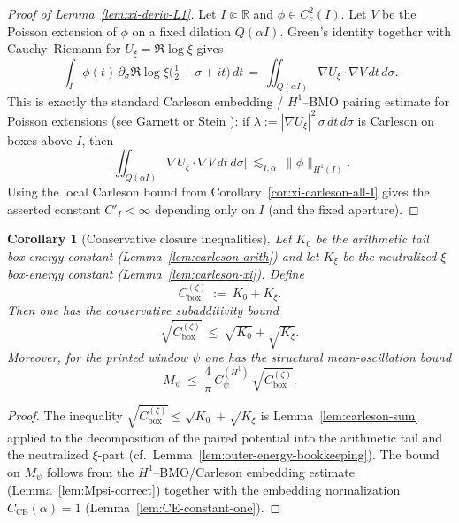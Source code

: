 \documentclass[11pt]{article}
\newif\ifshownumerics
\newtheorem{corollary}[theorem]{Corollary}
\theoremstyle{definition}
\theoremstyle{remark}
\theoremstyle{definition}
\newcommand{\R}{\mathbb{R}}
\begin{document}
\begin{proof}[Proof of Lemma~\ref{lem:xi-deriv-L1}]
Let $I\Subset\R$ and $\phi\in C_c^2(I)$. Let $V$ be the Poisson extension of $\phi$ on a fixed dilation $Q(\alpha I)$. Green's identity together with Cauchy–Riemann for $U_\xi=\Re\log\xi$ gives
\[
  \int_I \phi(t)\,\partial_\sigma\Re\log\xi\!\big(\tfrac12+\sigma+it\big)\,dt
  \,=\, \iint_{Q(\alpha I)} \nabla U_\xi\cdot\nabla V\,dt\,d\sigma.
\]
This is exactly the standard Carleson embedding / $H^1$–BMO pairing estimate for Poisson extensions (see Garnett \cite[Thm.~VI.1.1]{Garnett} or Stein \cite[Ch.~IV]{SteinSingInt}): if $\lambda:=|\nabla U_\xi|^2\,\sigma\,dt\,d\sigma$ is Carleson on boxes above $I$, then
\[
  \Big|\iint_{Q(\alpha I)} \nabla U_\xi\cdot\nabla V\,dt\,d\sigma\Big|
  \ \lesssim_{I,\alpha}\ \|\phi\|_{H^1(I)}.
\]
Using the local Carleson bound from Corollary~\ref{cor:xi-carleson-all-I} gives the asserted constant $C'_I<\infty$ depending only on $I$ (and the fixed aperture).
\end{proof}
\begin{corollary}[Conservative closure inequalities]\label{cor:conservative-closure}
Let $K_0$ be the arithmetic tail box-energy constant (Lemma~\ref{lem:carleson-arith}) and let $K_\xi$ be the neutralized $\xi$ box-energy constant (Lemma~\ref{lem:carleson-xi}). Define
\[
  C_{\mathrm{box}}^{(\zeta)}\ :=\ K_0+K_\xi.
\]
Then one has the conservative subadditivity bound
\[
  \sqrt{C_{\mathrm{box}}^{(\zeta)}}\ \le\ \sqrt{K_0}+\sqrt{K_\xi}.
\]
Moreover, for the printed window $\psi$ one has the structural mean-oscillation bound
\[
  M_\psi\ \le\ \frac{4}{\pi}\,C_\psi^{(H^1)}\,\sqrt{C_{\mathrm{box}}^{(\zeta)}}.
\]
\end{corollary}
\begin{proof}
The inequality $\sqrt{C_{\mathrm{box}}^{(\zeta)}}\le \sqrt{K_0}+\sqrt{K_\xi}$ is Lemma~\ref{lem:carleson-sum} applied to the decomposition of the paired potential into the arithmetic tail and the neutralized $\xi$-part (cf.\ Lemma~\ref{lem:outer-energy-bookkeeping}). The bound on $M_\psi$ follows from the $H^1$--BMO/Carleson embedding estimate (Lemma~\ref{lem:Mpsi-correct}) together with the embedding normalization $C_{\mathrm{CE}}(\alpha)=1$ (Lemma~\ref{lem:CE-constant-one}).
\end{proof}
\ifshownumerics
\end{document}
